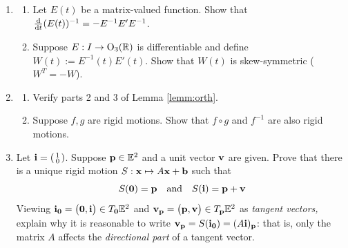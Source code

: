 \begin{exercises}
\begin{enumerate}
  \item\label{exs:lieorth}\begin{enumerate}
    \item Let $E(t)$ be a matrix-valued function. Show that $\frac{\mathrm{d} }{\mathrm{d} t}(E(t))^{-1}=-E^{-1}E'E^{-1}$.
		\item Suppose $E:I\to \mathrm{O}_3(\mathbb{R})$ is differentiable and define $W(t):=E^{-1}(t)E'(t)$. Show that $W(t)$ is skew-symmetric ($W^T=-W$).%
  \end{enumerate}
  
  
  \item\begin{enumerate}
    \item Verify parts 2 and 3 of Lemma \ref{lemm:orth}.
    \item Suppose $f,g$ are rigid motions. Show that $f\circ g$ and $f^{-1}$ are also rigid motions.
  \end{enumerate}
  
  \item\label{exs:tanvecrigid} Let ${\mathbf{i}}=\left(\begin{smallmatrix}1\\0\end{smallmatrix}\right)$. Suppose ${\mathbf{p}}\in\mathbb{E}^2$ and a unit vector ${\mathbf{v}}$ are given. Prove that there is a unique rigid motion $S:{\mathbf{x}}\mapsto A{\mathbf{x}}+{\mathbf{b}}$ such that
  \[S(\mathbf{0})={\mathbf{p}}\quad \text{and}\quad S({\mathbf{i}})={\mathbf{p}}+{\mathbf{v}}\]
  Viewing ${\mathbf{i}}_{\mathbf{0}}=\bigl(\mathbf{0},{\mathbf{i}}\bigr)\in T_{\mathbf{0}}\mathbb{E}^2$ and ${\mathbf{v}}_{{\mathbf{p}}}=\bigl({\mathbf{p}},{\mathbf{v}}\bigr)\in T_{{\mathbf{p}}}\mathbb{E}^2$ as \emph{tangent vectors,} explain why it is reasonable to write ${\mathbf{v}}_{{\mathbf{p}}}=S({\mathbf{i}}_{\mathbf{0}})=(A{\mathbf{i}})_{{\mathbf{p}}}$: that is, only the matrix $A$ affects the \emph{directional part} of a tangent vector.
	
% 
	

\end{enumerate}
\end{exercises}
